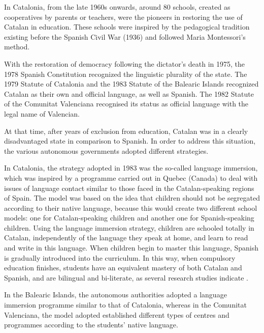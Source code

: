 \begin{multicols}{2}
In Catalonia, from the late 1960s onwards, around 80 schools, created as cooperatives by parents or teachers, were the pioneers in restoring the use of Catalan in education. These schools were inspired by the pedagogical tradition existing before the Spanish Civil War (1936) and followed Maria Montessori's method.

With the restoration of democracy following the dictator's death in 1975, the 1978 Spanish Constitution recognized the linguistic plurality of the state. The 1979 Statute of Catalonia and the 1983 Statute of the Balearic Islands recognized Catalan as their own and official language, as well as Spanish. The 1982 Statute of the Comunitat Valenciana recognised its status as official language with the legal name of Valencian.

At that time, after years of exclusion from education, Catalan was in a clearly disadvantaged state in comparison to Spanish. In order to address this situation, the various autonomous governments adopted different strategies.

In Catalonia, the strategy adopted in 1983 was the so-called language immersion, which was inspired by a programme carried out in Quebec (Canada) to deal with issues of language contact similar to those faced in the Catalan-speaking regions of Spain. The model was based on the idea that children should not be segregated according to their native language, because this would create two different school models: one for Catalan-speaking children and another one for Spanish-speaking children. Using the language immersion strategy, children are schooled totally in Catalan, independently of the language they speak at home, and learn to read and write in this language. When children begin to master this language, Spanish is gradually introduced into the curriculum. In this way, when compulsory education finishes, students have an equivalent mastery of both Catalan and Spanish, and are bilingual and bi-literate, as several research studies indicate \cite{CAT-Nota5}.


In the Balearic Islands, the autonomous authorities adopted a language immersion programme similar to that of Catalonia, whereas in the Comunitat Valenciana, the model adopted established different types of centres and programmes according to the students' native language.


\end{multicols}
